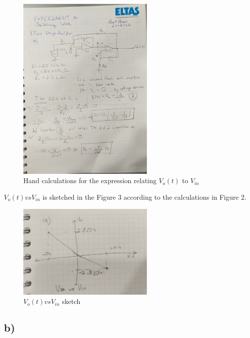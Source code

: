 \documentclass[letterpaper,12pt]{article}
\begin{document}
\begin{figure}[H]
	\centering
   \includegraphics[width=0.6\textwidth]{1_hand.jpeg}
   \caption{Hand calculations for the expression relating \(V_o(t)\) to \(V_{in}\)}
\end{figure} 
\(V_o(t) vs V_{in}\) is sketched in the Figure 3 according to the calculations in Figure 2.
\begin{figure}[H]
	\centering
   \includegraphics[width=0.6\textwidth]{1_a_sketch.jpeg}
   \caption{\(V_o(t) vs V_{in}\) sketch}
\end{figure} 
\subsection{b)}
\end{document}
